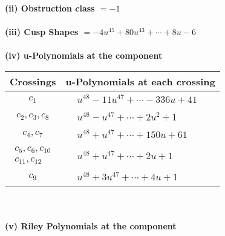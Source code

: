 \documentclass[1p]{elsarticle_modified}
\theoremstyle{definition}
\begin{document}
\flushleft \textbf{(ii) Obstruction class $= -1$}\\~\\
\flushleft \textbf{(iii) Cusp Shapes $= -4 u^{45}+80 u^{43}+\cdots+8 u-6$}\\~\\
\newpage\renewcommand{\arraystretch}{1}
\flushleft \textbf{(iv) u-Polynomials at the component}\newline \\
\begin{tabular}{m{50pt}|m{274pt}}
Crossings & \hspace{64pt}u-Polynomials at each crossing \\
\hline $$\begin{aligned}c_{1}\end{aligned}$$&$\begin{aligned}
&u^{48}-11 u^{47}+\cdots-336 u+41
\end{aligned}$\\
\hline $$\begin{aligned}c_{2},c_{3},c_{8}\end{aligned}$$&$\begin{aligned}
&u^{48}- u^{47}+\cdots+2 u^2+1
\end{aligned}$\\
\hline $$\begin{aligned}c_{4},c_{7}\end{aligned}$$&$\begin{aligned}
&u^{48}+u^{47}+\cdots+150 u+61
\end{aligned}$\\
\hline $$\begin{aligned}c_{5},c_{6},c_{10}\\c_{11},c_{12}\end{aligned}$$&$\begin{aligned}
&u^{48}+u^{47}+\cdots+2 u+1
\end{aligned}$\\
\hline $$\begin{aligned}c_{9}\end{aligned}$$&$\begin{aligned}
&u^{48}+3 u^{47}+\cdots+4 u+1
\end{aligned}$\\
\hline
\end{tabular}\\~\\
\newpage\renewcommand{\arraystretch}{1}
\flushleft \textbf{(v) Riley Polynomials at the component}\newline \\
\end{document}
